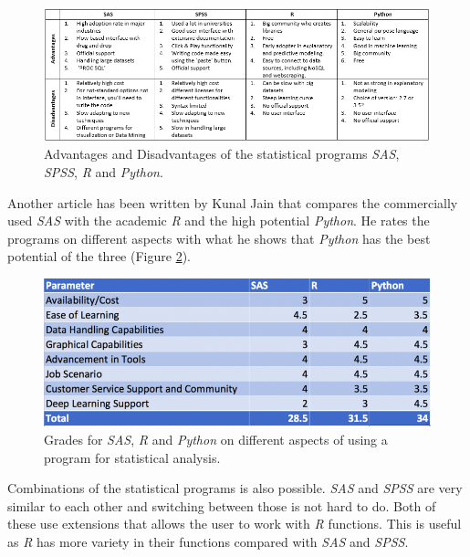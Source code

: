 \documentclass[10pt,a4paper]{report}
\begin{document}
	\begin{figure}[h!]
		\includegraphics[width=\textwidth]{StatProgComp.PNG}
		\caption{Advantages and Disadvantages of the statistical programs \textit{SAS}, 
			\textit{SPSS}, \textit{R} and \textit{Python}. \cite{BlogKromme2017}}
		\label{fig:StatProgComp}
	\end{figure}
	
	Another article has been written by Kunal Jain that compares the 
	commercially used \textit{SAS} with the academic \textit{R} and the high potential \textit{Python}. 
	He rates the programs on different aspects with what he shows that \textit{Python} 
	has the best potential of the three (Figure 
	\ref{fig:StatProgGrades}). \cite{BlogJain2017}
	
	\begin{figure}[h!]
		\includegraphics[width=\textwidth]{StatProgGrades.PNG}
		\caption{Grades for \textit{SAS}, \textit{R} and \textit{Python} on different aspects of using a 
			program for statistical analysis. \cite{BlogJain2017}}
		\label{fig:StatProgGrades}
	\end{figure}
	
	Combinations of the statistical programs is also possible. \textit{SAS} and \textit{SPSS} are 
	very similar to each other and switching between those is 
	not hard to do. Both of these use extensions that allows the user to work 
	with \textit{R} functions. This is useful as \textit{R} has more variety in their functions 
	compared with \textit{SAS} and \textit{SPSS}.
	 \cite{muenchen2011r}
	
\end{document}
